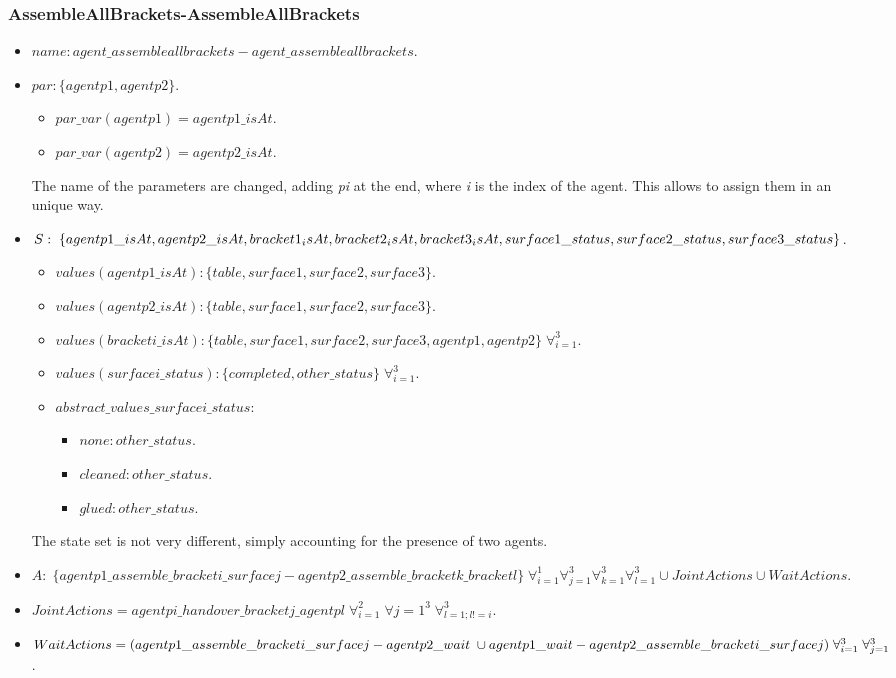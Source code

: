 \subsubsection{AssembleAllBrackets-AssembleAllBrackets}
\begin{itemize}
	\item $name: agent\_assembleallbrackets-agent\_assembleallbrackets$.
	\item		$par: \{agentp1,agentp2\}$.
		\begin{itemize}
			\item $par\_var(agentp1)=agentp1\_isAt$.
			\item $par\_var(agentp2)=agentp2\_isAt$.
		\end{itemize}

		The name of the parameters are changed, adding \textit{pi} at the end, where \textit{i} is the index of the agent. This allows to assign them in an unique way.
	\item $S:\;\{agentp1\_isAt,agentp2\_isAt, bracket1_isAt,bracket2_isAt,bracket3_isAt,\\
	surface1\_status,surface2\_status,surface3\_status\}$. 
		\begin{itemize}
			\item $values(agentp1\_isAt):\{table,surface1,surface2,surface3\}$.
			\item $values(agentp2\_isAt):\{table,surface1,surface2,surface3\}$.
			\item $values(bracketi\_isAt):\{table,surface1,surface2,surface3,agentp1,agentp2\}\; \forall_{i=1}^3$. 
			\item $values(surfacei\_status):\{completed,other\_status\}\;\forall_{i=1}^3$.
		\end{itemize}
		\begin{itemize}
			\item $abstract\_values\_surfacei\_status:$ 
				\begin{itemize}
					\item $none: other\_status$.
					\item $cleaned: other\_status$.
					\item $glued: other\_status$.
				\end{itemize}
		\end{itemize}
		The state set is not very different, simply accounting for the presence of two agents.

	\item $A:\;\{agentp1\_assemble\_bracketi\_surfacej-agentp2\_assemble\_bracketk\_bracketl\}\;\forall_{i=1}^1 \forall_{j=1}^3
	\forall_{k=1}^3 \forall_{l=1}^3 \cup JointActions \cup WaitActions$.
	\item $JointActions=agentpi\_handover\_bracketj\_agentpl \; \forall_{i=1}^2 \; \forall{j=1}^3 \; \forall_{l=1; l!=i}^3$.
	\item $WaitActions=(agentp1\_assemble\_bracketi\_surfacej-agentp2\_wait \; \cup \\
	 agentp1\_wait-agentp2\_assemble\_bracketi\_surfacej) \; \forall_{i=1}^3 \; \forall_{j=1}^3$.


\end{itemize}
